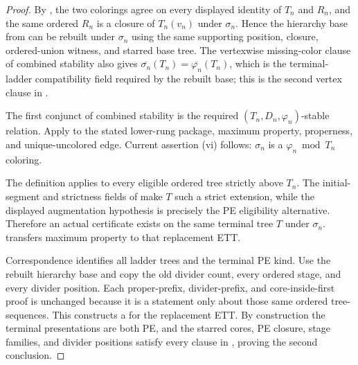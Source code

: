 \begin{proof}
By , the two colorings agree on
every displayed identity of $T_n$ and $R_n$, and the same ordered
$R_n$ is a closure of $T_n(v_n)$ under $\sigma_n$.  Hence the hierarchy
base from  can be rebuilt under $\sigma_n$ using
the same supporting position, closure, ordered-union witness, and starred
base tree.  The vertexwise missing-color clause of combined stability
also gives
$\overline{\sigma_n}(T_n)=\overline{\varphi_n}(T_n)$, which is the
terminal-ladder compatibility field required by the rebuilt base; this
is the second vertex clause in .

The first conjunct of combined stability is the required
$(T_n,D_n,\varphi_n)$-stable relation.  Apply  to the stated
lower-rung package, maximum property, properness, and unique-uncolored
edge.  Current assertion (vi) follows: $\sigma_n$ is a
$\varphi_n\bmod T_n$ coloring.

The definition  applies to every eligible ordered
tree strictly above $T_n$.  The initial-segment and strictness fields of
 make $T$ such a strict extension, while
the displayed augmentation hypothesis is precisely the PE eligibility
alternative.  Therefore an actual
 certificate exists on the
same terminal tree $T$ under $\sigma_n$.
 transfers maximum property to that
replacement ETT.

Correspondence identifies all ladder trees and the terminal PE kind.
Use the rebuilt hierarchy base and copy the old divider count, every
ordered stage, and every divider position.  Each proper-prefix,
divider-prefix, and core-inside-first proof is unchanged because it is a
statement only about those same ordered tree-sequences.  This constructs
a  for the replacement ETT.  By construction
the terminal presentations are both PE, and the starred cores, PE
closure, stage families, and divider positions satisfy every clause in
, proving the second conclusion.
\end{proof}
